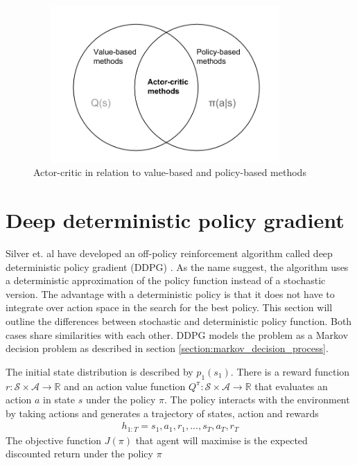 \documentclass[class=book, crop=false]{standalone}
\begin{document}
\begin{figure}[ht!]
    \center
    \includegraphics[height=6cm, width=10cm]{figures/Actor-critic.png}
    \caption[size = 9]{Actor-critic in relation to value-based and policy-based methods}
    \label{fig:theory:Actor-critic}
\end{figure}


\section{Deep deterministic policy gradient}
Silver et. al have developed an off-policy reinforcement algorithm called deep deterministic policy gradient (DDPG) \cite{pmlr-v32-silver14}. As the name suggest, the algorithm uses a deterministic approximation of the policy function instead of a stochastic version. The advantage with a deterministic policy is that it does not have to integrate over action space in the search for the best policy. This section will outline the differences between stochastic and deterministic policy function. Both cases share similarities with each other. DDPG models the problem as a Markov decision problem as described in section \ref{section:markov_decision_process}.

The initial state distribution is described by $p_{1}(s_{1})$. There is a reward function $r: \mathcal{S} \times \mathcal{A} \to \mathbb{R}$ and an action value function $Q^{\pi}:\mathcal{S} \times \mathcal{A} \to \mathbb{R}$ that evaluates an action $a$ in state $s$ under the policy $\pi$. The policy interacts with the environment by taking actions and generates a trajectory of states, action and rewards 
\begin{equation}
   \begin{aligned}\label{eq:theory:trajectory2}
h_{1:T} = s_{1},a_{1},r_{1},..., s_{T},a_{T},r_{T}
\end{aligned} 
\end{equation}
The objective function $J(\pi)$ that agent will maximise is the expected discounted return under the policy $\pi$
\end{document}
